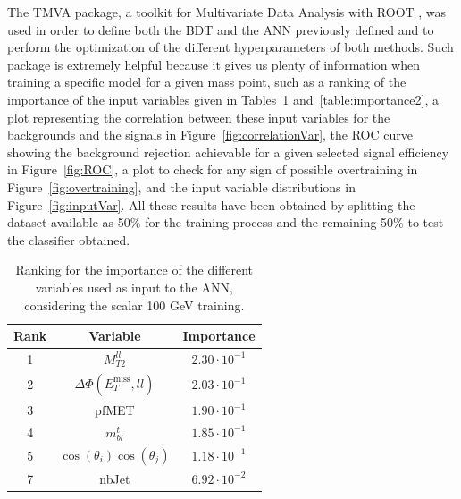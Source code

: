 \documentclass[a4paper, 10pt, openright]{report}
\begin{document}
The TMVA package, a toolkit for Multivariate Data Analysis with ROOT \cite{TMVA}, was used in order to define both the \ac{BDT} and the \ac{ANN} previously defined and to perform the optimization of the different hyperparameters of both methods. Such package is extremely helpful because it gives us plenty of information when training a specific model for a given mass point, such as a ranking of the importance of the input variables given in Tables~\ref{table:importance1} and~\ref{table:importance2}, a plot representing the correlation between these input variables for the backgrounds and the signals in Figure~\ref{fig:correlationVar}, the \ac{ROC} curve showing the background rejection achievable for a given selected signal efficiency in Figure~\ref{fig:ROC}, a plot to check for any sign of possible overtraining in Figure~\ref{fig:overtraining}, and the input variable distributions in Figure~\ref{fig:inputVar}. All these results have been obtained by splitting the dataset available as 50\% for the training process and the remaining 50\% to test the classifier obtained. 

\begin{table}
\begin{center}
\begin{tabular}{ c|c|c } 
\hline
 Rank & Variable & Importance \\
 \hline
 1 & $M_{T2}^{ll}$ & $2.30 \cdot 10^{-1}$ \\
 2 & $\Delta \Phi(E_{T}^{\text{miss}}, ll)$ & $2.03 \cdot 10^{-1}$ \\
 3 & pf\ac{MET} & $1.90 \cdot 10^{-1}$ \\
 4 & $m_{bl}^t$ & $1.85 \cdot 10^{-1}$ \\
 5 & $\cos(\theta_i) \cos(\theta_j)$ & $1.18 \cdot 10^{-1}$ \\
 7 & nbJet & $6.92 \cdot 10^{-2}$ \\
\hline
\end{tabular}
\caption{Ranking for the importance of the different variables used as input to the \ac{ANN}, considering the scalar 100 GeV training.}
\label{table:importance1}
\end{center}
\end{table}
\end{document}
